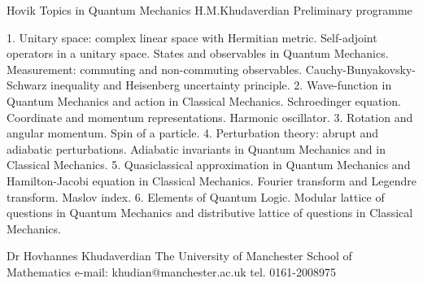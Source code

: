                          Hovik
                   Topics in Quantum Mechanics
                   H.M.Khudaverdian
   Preliminary programme

 	1. Unitary space: complex linear space with Hermitian metric.
Self-adjoint operators in a unitary space. States and observables in
Quantum Mechanics. Measurement: commuting and non-commuting observables.
Cauchy-Bunyakovsky-Schwarz inequality and Heisenberg uncertainty principle.
 	2. Wave-function in Quantum Mechanics and action in Classical
Mechanics. Schroedinger equation. Coordinate and momentum
representations. Harmonic oscillator.
 	3. Rotation and angular momentum. Spin of a particle.
 	4. Perturbation theory: abrupt and adiabatic perturbations.
Adiabatic invariants in Quantum Mechanics and in Classical Mechanics.
 	5. Quasiclassical approximation in Quantum Mechanics and
Hamilton-Jacobi equation in Classical Mechanics. Fourier transform and
Legendre transform. Maslov index.
 	6. Elements of Quantum Logic. Modular lattice of questions
in Quantum Mechanics and distributive lattice of
questions in  Classical Mechanics.




                                      Dr Hovhannes Khudaverdian
                                      The University of Manchester
                                         School of Mathematics
                                     e-mail: khudian@manchester.ac.uk
                                          tel. 0161-2008975



